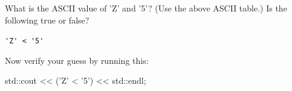 What is the ASCII value of 'Z' and '5'? (Use the above ASCII table.) Is the following true or false?



\begin{center}

\verb!'Z' < '5'!

\end{center}



Now verify your guess by running this:

\begin{consolethree}[escapeinside=||]

std::cout << ('Z' < '5') << std::endl;

\end{consolethree}


